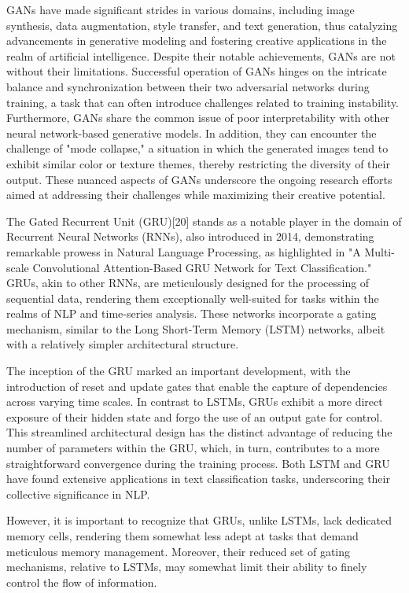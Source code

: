 \documentclass[conference]{IEEEtran}
\begin{document}
GANs have made significant strides in various domains, including image synthesis, data augmentation, style transfer, and text generation, thus catalyzing advancements in generative modeling and fostering creative applications in the realm of artificial intelligence. Despite their notable achievements, GANs are not without their limitations. Successful operation of GANs hinges on the intricate balance and synchronization between their two adversarial networks during training, a task that can often introduce challenges related to training instability. Furthermore, GANs share the common issue of poor interpretability with other neural network-based generative models. In addition, they can encounter the challenge of "mode collapse," a situation in which the generated images tend to exhibit similar color or texture themes, thereby restricting the diversity of their output. These nuanced aspects of GANs underscore the ongoing research efforts aimed at addressing their challenges while maximizing their creative potential.


The Gated Recurrent Unit (GRU)[20] stands as a notable player in the domain of Recurrent Neural Networks (RNNs), also introduced in 2014, demonstrating remarkable prowess in Natural Language Processing, as highlighted in "A Multi-scale Convolutional Attention-Based GRU Network for Text Classification." GRUs, akin to other RNNs, are meticulously designed for the processing of sequential data, rendering them exceptionally well-suited for tasks within the realms of NLP and time-series analysis. These networks incorporate a gating mechanism, similar to the Long Short-Term Memory (LSTM) networks, albeit with a relatively simpler architectural structure.


The inception of the GRU marked an important development, with the introduction of reset and update gates that enable the capture of dependencies across varying time scales. In contrast to LSTMs, GRUs exhibit a more direct exposure of their hidden state and forgo the use of an output gate for control. This streamlined architectural design has the distinct advantage of reducing the number of parameters within the GRU, which, in turn, contributes to a more straightforward convergence during the training process. Both LSTM and GRU have found extensive applications in text classification tasks, underscoring their collective significance in NLP.


However, it is important to recognize that GRUs, unlike LSTMs, lack dedicated memory cells, rendering them somewhat less adept at tasks that demand meticulous memory management. Moreover, their reduced set of gating mechanisms, relative to LSTMs, may somewhat limit their ability to finely control the flow of information. 
\end{document}
